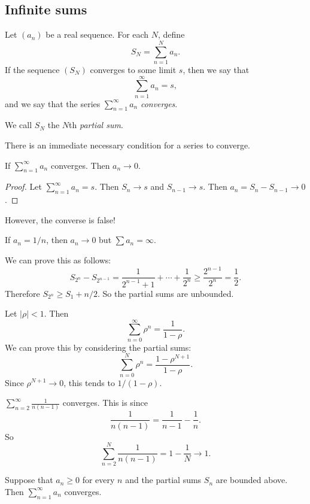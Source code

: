 \documentclass[a4paper]{article}
\begin{document}
\subsection{Infinite sums}
\begin{defi}
  Let $(a_n)$ be a real sequence. For each $N$, define
  \[
    S_N = \sum_{n = 1}^N a_n.
  \]
  If the sequence $(S_N)$ converges to some limit $s$, then we say that
  \[
    \sum_{n = 1}^\infty a_n = s,
  \]
  and we say that the series $\displaystyle\sum_{n = 1}^\infty a_n$ \emph{converges}.

  We call $S_N$ the $N$th \emph{partial sum}.
\end{defi}

There is an immediate necessary condition for a series to converge.
\begin{lemma}
  If $\displaystyle\sum_{n = 1}^\infty a_n$ converges. Then $a_n \to 0$.
\end{lemma}

\begin{proof}
  Let $\displaystyle\sum_{n = 1}^{\infty} a_n = s$. Then $S_n \to s$ and $S_{n - 1} \to s$. Then $a_n = S_n - S_{n - 1} \to 0$.
\end{proof}

However, the converse is false!
\begin{eg}
  If $a_n = 1/n$, then $a_n \to 0$ but $\sum a_n = \infty$.

  We can prove this as follows:
  \[
    S_{2^n} - S_{2^{n -1 }} = \frac{1}{2^{n - 1} + 1} + \cdots + \frac{1}{2^n} \geq \frac{2^{n - 1}}{2^n} = \frac{1}{2}.
  \]
  Therefore $S_{2^n} \geq S_1 + n/2$. So the partial sums are unbounded.
\end{eg}

\begin{eg}
  Let $|\rho| < 1$. Then
  \[
    \sum_{n = 0}^\infty \rho^n = \frac{1}{1 - \rho}.
  \]
  We can prove this by considering the partial sums:
  \[
    \sum_{n = 0}^N \rho^n = \frac{1 - \rho^{N + 1}}{1 - \rho}.
  \]
  Since $\rho^{N + 1} \to 0$, this tends to $1/(1 - \rho)$.
\end{eg}

\begin{eg}
  $\displaystyle \sum_{n = 2}^\infty \frac{1}{n(n - 1)}$ converges. This is since
  \[
    \frac{1}{n(n -1 )} = \frac{1}{n - 1} - \frac{1}{n}.
  \]
  So
  \[
    \sum_{n = 2}^{N}\frac{1}{n(n - 1)} = 1 - \frac{1}{N} \to 1.
  \]
\end{eg}
\begin{lemma}
  Suppose that $a_n \geq 0$ for every $n$ and the partial sums $S_n$ are bounded above. Then $\sum_{n=1}^\infty a_n$ converges.
\end{lemma}
\end{document}
